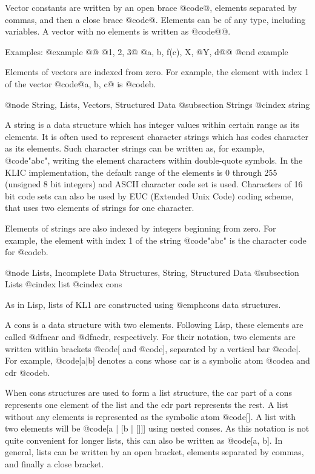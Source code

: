 {Vector constants are written by an open brace @code{@{}, elements
separated by commas, and then a close brace @code{@}}.  Elements can be
of any type, including variables.  A vector with no elements is written
as @code{@{@}}.

Examples:
@example
@{@}   @{1, 2, 3@}   @{a, b, f(c), X, @{Y, d@}@}
@end example

Elements of vectors are indexed from zero.  For example, the element
with index 1 of the vector @code{@{a, b, c@}} is @code{b}.

@node String, Lists, Vectors, Structured Data
@subsection Strings
@cindex string

A string is a data structure which has integer values within certain
range as its elements.  It is often used to represent character strings
which has codes character as its elements.  Such character strings can
be written as, for example, @code{"abc"}, writing the element characters
within double-quote symbols.  In the KLIC implementation, the default
range of the elements is 0 through 255 (unsigned 8 bit integers) and
ASCII character code set is used.  Characters of 16 bit code sets can
also be used by EUC (Extended Unix Code) coding scheme, that uses two
elements of strings for one character.

Elements of strings are also indexed by integers beginning from zero.
For example, the element with index 1 of the string @code{"abc"} is the
character code for @code{b}.

@node Lists, Incomplete Data Structures, String, Structured Data
@subsection Lists
@cindex list
@cindex cons

As in Lisp, lists of KL1 are constructed using @emph{cons} data
structures.

A cons is a data structure with two elements.  Following Lisp, these
elements are called @dfn{car} and @dfn{cdr}, respectively.  For their
notation, two elements are written within brackets @code{[} and
@code{]}, separated by a vertical bar @code{|}.  For example,
@code{[a|b]} denotes a cons whose car is a symbolic atom @code{a} and
cdr @code{b}.

When cons structures are used to form a list structure, the car part of
a cons represents one element of the list and the cdr part represents
the rest.  A list without any elements is represented as the symbolic
atom @code{[]}.  A list with two elements will be @code{[a | [b | []]]}
using nested conses.  As this notation is not quite convenient for
longer lists, this can also be written as @code{[a, b]}.  In general,
lists can be written by an open bracket, elements separated by commas,
and finally a close bracket.

}
